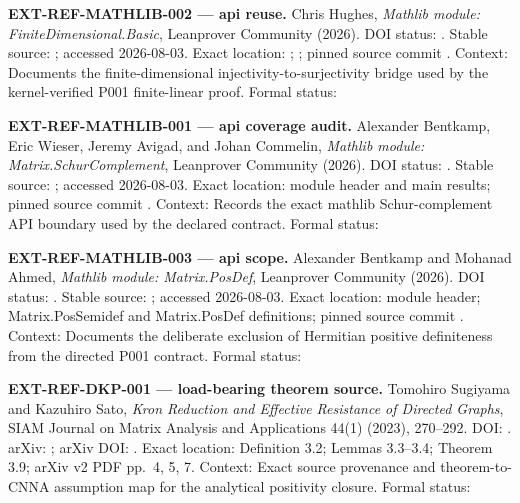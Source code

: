 \textbf{EXT-REF-MATHLIB-002 --- api reuse.} Chris Hughes, \emph{Mathlib
module: FiniteDimensional.Basic}, Leanprover Community (2026). DOI
status: \texttt{\protect{}}. Stable source:
\texttt{\protect{}};
accessed 2026-08-03. Exact location:
\texttt{\protect{}};
\texttt{\protect{}}; pinned source commit
\texttt{\protect{}}. Context: Documents
the finite-dimensional injectivity-to-surjectivity bridge used by the
kernel-verified P001 finite-linear proof. Formal status:
\texttt{\protect{}}

\textbf{EXT-REF-MATHLIB-001 --- api coverage audit.} Alexander Bentkamp,
Eric Wieser, Jeremy Avigad, and Johan Commelin, \emph{Mathlib module:
Matrix.SchurComplement}, Leanprover Community (2026). DOI status:
\texttt{\protect{}}. Stable source:
\texttt{\protect{}};
accessed 2026-08-03. Exact location: module header and main results;
pinned source commit \texttt{\protect{}}.
Context: Records the exact mathlib Schur-complement API boundary used by
the declared contract. Formal status:
\texttt{\protect{}}

\textbf{EXT-REF-MATHLIB-003 --- api scope.} Alexander Bentkamp and
Mohanad Ahmed, \emph{Mathlib module: Matrix.PosDef}, Leanprover
Community (2026). DOI status: \texttt{\protect{}}.
Stable source:
\texttt{\protect{}};
accessed 2026-08-03. Exact location: module header; Matrix.PosSemidef
and Matrix.PosDef definitions; pinned source commit
\texttt{\protect{}}. Context: Documents
the deliberate exclusion of Hermitian positive definiteness from the
directed P001 contract. Formal status:
\texttt{\protect{}}

\textbf{EXT-REF-DKP-001 --- load-bearing theorem source.} Tomohiro
Sugiyama and Kazuhiro Sato, \emph{Kron Reduction and Effective
Resistance of Directed Graphs}, SIAM Journal on Matrix Analysis and
Applications 44(1) (2023), 270--292. DOI: \texttt{\protect{}}.
arXiv: \texttt{\protect{}}; arXiv DOI:
\texttt{\protect{}}. Exact location: Definition 3.2;
Lemmas 3.3--3.4; Theorem 3.9; arXiv v2 PDF pp.~4, 5, 7. Context: Exact
source provenance and theorem-to-CNNA assumption map for the analytical
positivity closure. Formal status:
\texttt{\protect{}}

